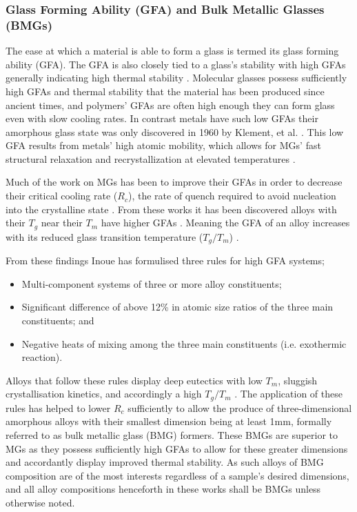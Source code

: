 \documentclass[a4paper,12pt,oneside]{report}%
\begin{document}
\subsubsection{Glass Forming Ability (GFA) and Bulk Metallic Glasses (BMGs)}

The ease at which a material is able to form a glass is termed its glass forming ability (GFA). The GFA is also closely tied to a glass's stability with high GFAs generally indicating high thermal stability \cite{Aji2013}. Molecular glasses possess sufficiently high GFAs and thermal stability that the material has been produced since ancient times, and polymers' GFAs are often high enough they can form glass even with slow cooling rates. In contrast metals have such low GFAs their amorphous glass state was only discovered in 1960 by Klement, et al. \cite{Klement1960}. This low GFA results from metals' high atomic mobility, which allows for  MGs' fast structural relaxation and recrystallization at elevated temperatures  \cite{Aji2013}. 

Much of the work on MGs has been to improve their GFAs in order to decrease their critical cooling rate ($R_{c}$), the rate of quench required to avoid nucleation into the crystalline state \cite{Inoue2000}. From these works it has been discovered alloys with their $T_{g}$ near their $T_{m}$ have higher GFAs \cite{Inoue2000, Trexler2010, Turnbull1969}. Meaning the GFA of an alloy increases with its reduced glass transition temperature ($T_{g}/T_{m}$) \cite{Inoue2000, Trexler2010, Turnbull1969}. 

From these findings Inoue \cite{Inoue2000} has formulised three rules for high GFA systems;

\begin{itemize}
	\item Multi-component systems of three or more alloy constituents;
	\item Significant difference of above 12\% in atomic size ratios of the three main constituents; and
	\item Negative heats of mixing among the three main constituents (i.e. exothermic reaction).
\end{itemize}

Alloys that follow these rules display deep eutectics with low $T_{m}$, sluggish crystallisation kinetics, and accordingly a high $T_{g}/T_{m}$ \cite{Inoue2000, Schroers2010}. The application of these rules has helped to lower $R_{c}$ sufficiently to allow the produce of three-dimensional amorphous alloys with their smallest dimension being at least 1mm, formally referred to as bulk metallic glass (BMG) formers. These BMGs are superior to MGs as they possess sufficiently high GFAs to allow for these greater dimensions and accordantly display improved thermal stability. As such alloys of BMG composition are of the most interests regardless of a sample's desired dimensions, and all alloy compositions henceforth in these works shall be BMGs unless otherwise noted. 
\end{document}
